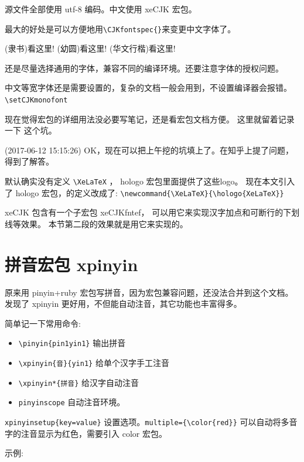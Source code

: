 \documentclass[a4paper,11pt]{article}
\begin{document}
源文件全部使用 utf-8 编码。中文使用 xeCJK 宏包。

\XeLaTeX 最大的好处是可以方便地用\verb+\CJKfontspec{}+来变更中文字体了。

{(隶书)看这里!}
{(幼圆)看这里!}
{(华文行楷)看这里!}

还是尽量选择通用的字体，兼容不同的编译环境。还要注意字体的授权问题。

中文等宽字体还是需要设置的，复杂的文档一般会用到，不设置编译器会报错。
\verb+\setCJKmonofont+

现在觉得宏包的详细用法没必要写笔记，还是看宏包文档方便。
这里就留着记录一下 \XeLaTeX 这个坑。

(2017-06-12 15:15:26)
OK，现在可以把上午挖的坑填上了。在知乎上提了问题，得到了解答。

默认确实没有定义 \verb+\XeLaTeX+ ， hologo 宏包里面提供了这些logo。
现在本文引入了 hologo 宏包，\XeLaTeX 的定义改成了:
\verb+\newcommand{\XeLaTeX}{\hologo{XeLaTeX}}+

xeCJK 包含有一个子宏包 xeCJKfntef，
可以用它来实现汉字加点和可断行的下划线等效果。
本节第二段的效果就是用它来实现的。

\section{拼音宏包 xpinyin}
原来用 pinyin+ruby 宏包写拼音，因为宏包兼容问题，还没法合并到这个文档。
发现了 xpinyin 更好用，不但能自动注音，其它功能也丰富得多。

简单记一下常用命令:
\begin{itemize}
	\item \verb+\pinyin{pin1yin1}+ 输出拼音
	\item \verb+\xpinyin{音}{yin1}+ 给单个汉字手工注音
	\item \verb+\xpinyin*{拼音}+ 给汉字自动注音
	\item \verb+pinyinscope+ 自动注音环境。
\end{itemize}

\verb+xpinyinsetup{key=value}+ 设置选项。\verb+multiple={\color{red}}+
可以自动将多音字的注音显示为红色，需要引入 color 宏包。

\vspace{3mm}
示例: {\LARGE{}}
\end{document}
